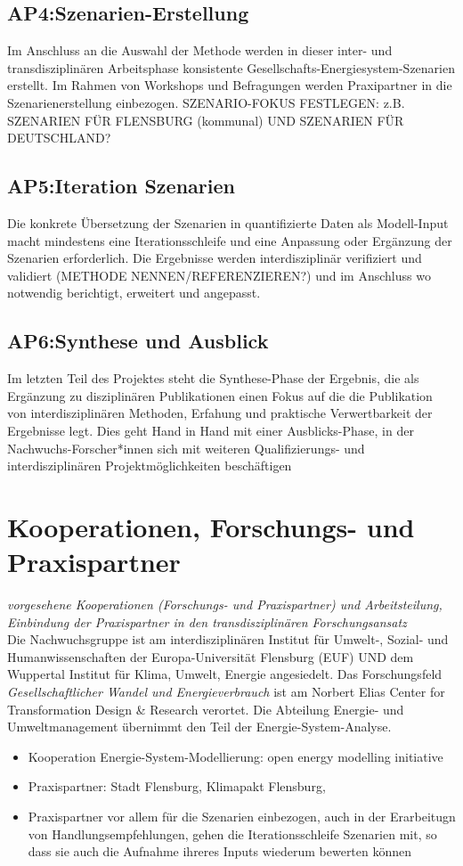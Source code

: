 \documentclass[a4paper,11pt,twoside]{scrartcl}
\begin{document}
\subsection*{AP4:Szenarien-Erstellung}
Im Anschluss an die Auswahl der Methode werden in dieser inter- und transdisziplinären Arbeitsphase konsistente Gesellschafts-Energiesystem-Szenarien erstellt. Im Rahmen von Workshops und Befragungen werden Praxipartner in die Szenarienerstellung einbezogen. SZENARIO-FOKUS FESTLEGEN: z.B. SZENARIEN FÜR FLENSBURG (kommunal) UND SZENARIEN FÜR DEUTSCHLAND?

\subsection*{AP5:Iteration Szenarien}
Die konkrete Übersetzung der Szenarien in quantifizierte Daten als Modell-Input macht mindestens eine Iterationsschleife und eine Anpassung oder Ergänzung der Szenarien erforderlich. Die Ergebnisse werden interdisziplinär verifiziert und validiert (METHODE NENNEN/REFERENZIEREN?) und im Anschluss wo notwendig berichtigt, erweitert und angepasst.

\subsection*{AP6:Synthese und Ausblick}
Im letzten Teil des Projektes steht die Synthese-Phase der Ergebnis, die als Ergänzung zu disziplinären Publikationen einen Fokus auf die die Publikation von interdisziplinären Methoden, Erfahung und praktische Verwertbarkeit der Ergebnisse legt. Dies geht Hand in Hand mit einer Ausblicks-Phase, in der Nachwuchs-Forscher*innen sich mit weiteren Qualifizierungs- und interdisziplinären Projektmöglichkeiten beschäftigen

\section{Kooperationen, Forschungs- und Praxispartner}
\textit{vorgesehene Kooperationen (Forschungs- und Praxispartner) und Arbeitsteilung, Einbindung der Praxispartner in den transdisziplinären Forschungsansatz}\\
Die Nachwuchsgruppe ist am interdisziplinären Institut für Umwelt-, Sozial- und Humanwissenschaften der Europa-Universität Flensburg (EUF) UND dem Wuppertal Institut für Klima, Umwelt, Energie angesiedelt. Das Forschungsfeld \textit{Gesellschaftlicher Wandel und Energieverbrauch} ist am Norbert Elias Center for Transformation Design & Research verortet. Die Abteilung Energie- und Umweltmanagement übernimmt den Teil der Energie-System-Analyse.
\begin{itemize}
 \item Kooperation Energie-System-Modellierung: open energy modelling initiative
 \item Praxispartner: Stadt Flensburg, Klimapakt Flensburg, 
 \item Praxispartner vor allem für die Szenarien einbezogen, auch in der Erarbeitugn von Handlungsempfehlungen, gehen die Iterationsschleife Szenarien mit, so dass sie auch die Aufnahme ihreres Inputs wiederum bewerten können
\end{itemize}
\end{document}
